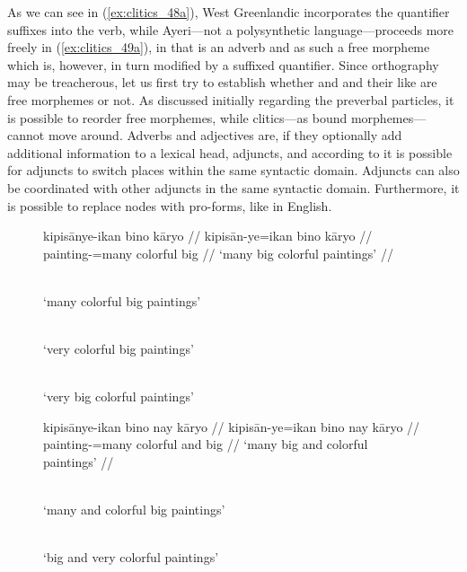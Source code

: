 As we can see in (\ref{ex:clitics_48a}), West Greenlandic incorporates the
quantifier suffixes into the verb, while Ayeri---not a polysynthetic
language---proceeds more freely in (\ref{ex:clitics_49a}), in that
 is an adverb and as such a free
morpheme which is, however, in turn modified by a suffixed quantifier. Since
orthography may be treacherous, let us first try to establish whether
 and  and their
like are free morphemes or not. As discussed initially regarding the preverbal
particles, it is possible to reorder free morphemes, while clitics---as bound
morphemes---cannot move around. Adverbs and adjectives are, if they optionally
add additional information to a lexical head, adjuncts, and according to
\citet{carnie2013} it is possible for adjuncts to switch places within the same
syntactic domain. Adjuncts can also be coordinated with other adjuncts in the
same syntactic domain. Furthermore, it is possible to replace  nodes
with pro-forms, like  in English.

\begin{figure}[h]
\pex\label{ex:clitics_50}
\a\label{ex:clitics_50a}\begingl
	\gla kipisānye-ikan bino kāryo //
	\glb kipisān-ye=ikan bino kāryo //
	\glc painting-\Pl{}=many colorful big //
	\glft `many big colorful paintings' //
\endgl

\a\label{ex:clitics_50b}  \\
	`many colorful big paintings'

\a\label{ex:clitics_50c} \ljudge{\excl}  \\
	\hphantom{\excl}`very colorful big paintings'

\a\label{ex:clitics_50d} \ljudge{\excl}  \\
	\hphantom{\excl}`very big colorful paintings'
\xe
\end{figure}

\begin{figure}[h]
\pex\label{ex:clitics_51}
\a\label{ex:clitics_51a}\begingl
	\gla kipisānye-ikan bino nay kāryo //
	\glb kipisān-ye=ikan bino nay kāryo //
	\glc painting-\Pl{}=many colorful and big //
	\glft `many big and colorful paintings' //
\endgl

\a\label{ex:clitics_51b} \ljudge{*}  \\
	\hphantom{*}`many and colorful big paintings'

\a\label{ex:clitics_51c} \ljudge{\excl}  \\
	\hphantom{\excl}`big and very colorful paintings'
\xe
\end{figure}

